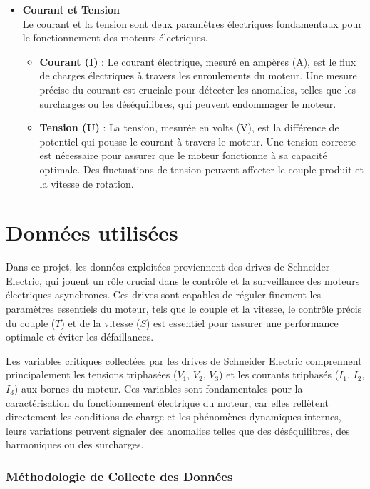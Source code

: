 \begin{itemize}
  \item \textbf{Courant et Tension} \\
        Le courant et la tension sont deux paramètres électriques fondamentaux pour le fonctionnement des moteurs électriques.
        \begin{itemize}
          \item \textbf{Courant (I)} : Le courant électrique, mesuré en ampères (A), est le flux de charges électriques à travers les enroulements du moteur. Une mesure précise du courant est cruciale pour détecter les anomalies, telles que les surcharges ou les déséquilibres, qui peuvent endommager le moteur.
          \item \textbf{Tension (U)} : La tension, mesurée en volts (V), est la différence de potentiel qui pousse le courant à travers le moteur. Une tension correcte est nécessaire pour assurer que le moteur fonctionne à sa capacité optimale. Des fluctuations de tension peuvent affecter le couple produit et la vitesse de rotation.
        \end{itemize}

\end{itemize}

\section{Données utilisées }

Dans ce projet, les données exploitées proviennent des drives de Schneider
Electric, qui jouent un rôle crucial dans le contrôle et la surveillance des
moteurs électriques asynchrones. Ces drives sont capables de réguler finement
les paramètres essentiels du moteur, tels que le couple et la vitesse, le
contrôle précis du couple (\(T\)) et de la vitesse (\(S\)) est essentiel pour
assurer une performance optimale et éviter les défaillances.

Les variables critiques collectées par les drives de Schneider Electric
comprennent principalement les tensions triphasées (\(V_1\), \(V_2\), \(V_3\))
et les courants triphasés (\(I_1\), \(I_2\), \(I_3\)) aux bornes du moteur. Ces
variables sont fondamentales pour la caractérisation du fonctionnement
électrique du moteur, car elles reflètent directement les conditions de charge
et les phénomènes dynamiques internes, leurs variations peuvent signaler des
anomalies telles que des déséquilibres, des harmoniques ou des surcharges.

\subsubsection{Méthodologie de Collecte des Données}

